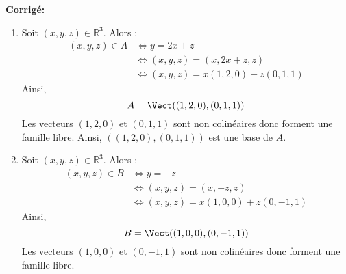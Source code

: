 \documentclass[a4paper,twoside,french,10pt]{VcCours}
\newcommand{\corr}{\textbf{Corrigé:}}
\begin{document}
\corr 

\begin{enumerate}
\item Soit $(x,y,z) \in \mathbb{R}^3$. Alors :
\begin{align*}
(x,y,z) \in A& \Longleftrightarrow y=2x+z \\
& \Longleftrightarrow (x,y,z)=(x,2x+z,z) \\
& \Longleftrightarrow (x,y,z) = x (1,2,0) + z(0,1,1)
\end{align*}
Ainsi,
$$ A = \Vect((1,2,0),(0,1,1))$$
Les vecteurs $(1,2,0)$ et $(0,1,1)$ sont non colinéaires donc forment une famille libre. Ainsi, $((1,2,0),(0,1,1))$ est une base de $A$.

\item Soit $(x,y,z) \in \mathbb{R}^3$. Alors :
\begin{align*}
(x,y,z) \in B&\Longleftrightarrow y=-z \\
& \Longleftrightarrow (x,y,z)=(x,-z,z) \\
& \Longleftrightarrow (x,y,z) = x (1,0,0) + z (0,-1,1) 
\end{align*}
Ainsi,
$$ B = \Vect((1,0,0),(0,-1,1))$$
Les vecteurs $(1,0,0)$ et $(0,-1,1)$ sont non colinéaires donc forment une famille libre.


\end{enumerate}
\end{document}
